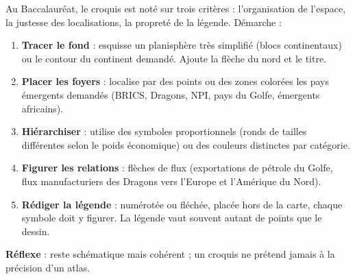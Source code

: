 \documentclass[11pt]{article}
\begin{document}
\begin{methode}
Au Baccalauréat, le croquis est noté sur trois critères : l'organisation de l'espace, la justesse des localisations, la propreté de la légende. Démarche :
\begin{enumerate}
\item \textbf{Tracer le fond} : esquisse un planisphère très simplifié (blocs continentaux) ou le contour du continent demandé. Ajoute la flèche du nord et le titre.
\item \textbf{Placer les foyers} : localise par des points ou des zones colorées les pays émergents demandés (BRICS, Dragons, NPI, pays du Golfe, émergents africains).
\item \textbf{Hiérarchiser} : utilise des symboles proportionnels (ronds de tailles différentes selon le poids économique) ou des couleurs distinctes par catégorie.
\item \textbf{Figurer les relations} : flèches de flux (exportations de pétrole du Golfe, flux manufacturiers des Dragons vers l'Europe et l'Amérique du Nord).
\item \textbf{Rédiger la légende} : numérotée ou fléchée, placée hors de la carte, chaque symbole doit y figurer. La légende vaut souvent autant de points que le dessin.
\end{enumerate}
\textbf{Réflexe} : reste schématique mais cohérent ; un croquis ne prétend jamais à la précision d'un atlas.
\end{methode}
\end{document}
